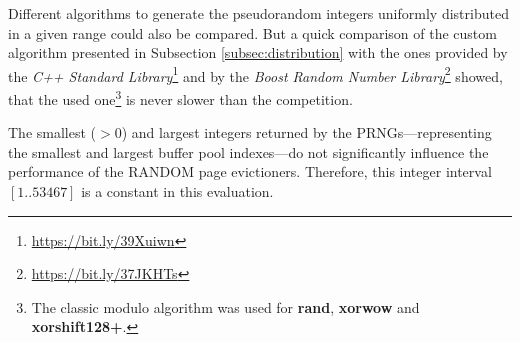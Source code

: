     Different algorithms to generate the pseudorandom integers uniformly distributed in a given range could also be compared. But a quick comparison of the custom algorithm presented in Subsection \ref{subsec:distribution} with the ones provided by the \textit{C++ Standard Library}\footnote[13]{\url{https://bit.ly/39Xuiwn}} and by the \textit{Boost Random Number Library}\footnote[14]{\url{https://bit.ly/37JKHTs}} showed, that the used one\footnote[15]{The classic modulo algorithm was used for \textbf{rand}, \textbf{xorwow} and \textbf{xorshift128+}.} is never slower than the competition.

    The smallest ($>0$) and largest integers returned by the PRNGs---re\-pre\-sen\-ting the smallest and largest buffer pool indexes---do not significantly influence the performance of the RANDOM page evictioners. Therefore, this integer interval $\left[1 .. 53467\right]$ is a constant in this evaluation.

